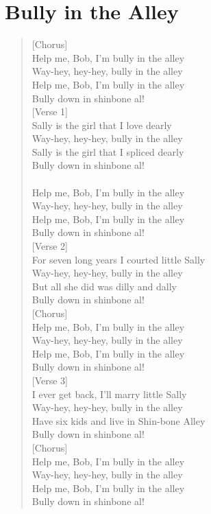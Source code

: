 \documentclass[11pt]{article}
\begin{document}
\section{Bully in the Alley}
\label{sec:orgba51aa1}
\begin{verse}
[Chorus]\\
Help me, Bob, I'm bully in the alley\\
Way-hey, hey-hey, bully in the alley\\
Help me, Bob, I'm bully in the alley\\
Bully down in shinbone al!\\
\vspace*{1em}
[Verse 1]\\
Sally is the girl that I love dearly\\
Way-hey, hey-hey, bully in the alley\\
Sally is the girl that I spliced dearly\\
Bully down in shinbone al!\\
[Chorus]\\
Help me, Bob, I'm bully in the alley\\
Way-hey, hey-hey, bully in the alley\\
Help me, Bob, I'm bully in the alley\\
Bully down in shinbone al!\\
\vspace*{1em}
[Verse 2]\\
For seven long years I courted little Sally\\
Way-hey, hey-hey, bully in the alley\\
But all she did was dilly and dally\\
Bully down in shinbone al!\\
\vspace*{1em}
[Chorus]\\
Help me, Bob, I'm bully in the alley\\
Way-hey, hey-hey, bully in the alley\\
Help me, Bob, I'm bully in the alley\\
Bully down in shinbone al!\\
\vspace*{1em}
[Verse 3]\\
I ever get back, I'll marry little Sally\\
Way-hey, hey-hey, bully in the alley\\
Have six kids and live in Shin-bone Alley\\
Bully down in shinbone al!\\
\vspace*{1em}
[Chorus]\\
Help me, Bob, I'm bully in the alley\\
Way-hey, hey-hey, bully in the alley\\
Help me, Bob, I'm bully in the alley\\
Bully down in shinbone al!\\
\end{verse}
\clearpage
\end{document}
